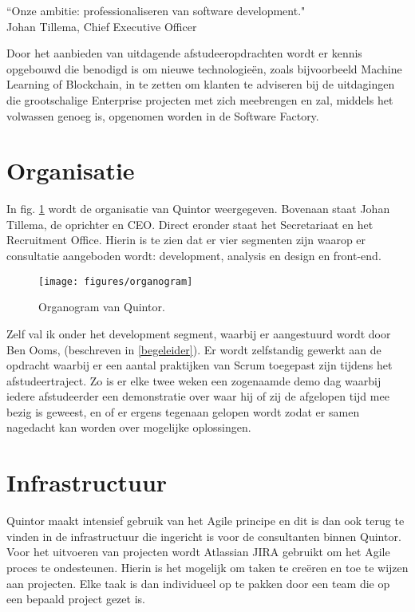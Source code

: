 \begin{formal}
  \label{visie}
  ``Onze ambitie: professionaliseren van software development."
  \\ Johan Tillema, Chief Executive Officer
\end{formal}

Door het aanbieden van uitdagende afstudeeropdrachten wordt er kennis opgebouwd die benodigd is om nieuwe technologieën, zoals bijvoorbeeld Machine Learning of Blockchain, in te zetten om klanten te adviseren bij de uitdagingen die grootschalige Enterprise projecten met zich meebrengen en zal, middels het volwassen genoeg is, opgenomen worden in de Software Factory.

\section{Organisatie}
In fig. \ref{organogram} wordt de organisatie van Quintor weergegeven. Bovenaan staat Johan Tillema, de oprichter en CEO. Direct eronder staat het Secretariaat en het Recruitment Office. Hierin is te zien dat er vier segmenten zijn waarop er consultatie aangeboden wordt: development, analysis en design en front-end.

\begin{figure}[h]
  \texttt{[image: figures/organogram]}
  \caption{Organogram van Quintor.}
  \label{organogram}
\end{figure}

\newpage
Zelf val ik onder het development segment, waarbij er aangestuurd wordt door Ben Ooms, (beschreven in \ref{begeleider}). Er wordt zelfstandig gewerkt aan de opdracht waarbij er een aantal praktijken van Scrum toegepast zijn tijdens het afstudeertraject. Zo is er elke twee weken een zogenaamde demo dag waarbij iedere afstudeerder een demonstratie over waar hij of zij de afgelopen tijd mee bezig is geweest, en of er ergens tegenaan gelopen wordt zodat er samen nagedacht kan worden over mogelijke oplossingen.

\section{Infrastructuur}

Quintor maakt intensief gebruik van het Agile principe en dit is dan ook terug te vinden in de infrastructuur die ingericht is voor de consultanten binnen Quintor. Voor het uitvoeren van projecten wordt Atlassian JIRA gebruikt om het Agile proces te ondesteunen. Hierin is het mogelijk om taken te creëren en toe te wijzen aan projecten. Elke taak is dan individueel op te pakken door een team die op een bepaald project gezet is. 

